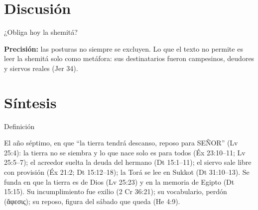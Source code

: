 \documentclass[hyperref={bookmarks=false},aspectratio=169]{beamer}
\newcommand{\grc}[1]{\foreignlanguage{ancientgreek}{#1}}
\newcommand{\SENOR}{S{\fontsize{0.78em}{1em}\selectfont EÑOR}}
\newcommand{\precision}[1]{{\footnotesize\color{sepia}\textbf{Precisión:} #1}}
\begin{document}
\section{Discusión}

\begin{frame}{¿Obliga hoy la shemitá?}
\par\medskip
\precision{las posturas no siempre se excluyen. Lo que el texto no permite es leer la shemitá solo como metáfora: sus destinatarios fueron campesinos, deudores y siervos reales (Jer 34).}
\end{frame}

\section{Síntesis}

\begin{frame}{Definición}
\begin{tcolorbox}[colback=papiro,colframe=tierraroja,boxrule=1pt,arc=3pt,fonttitle=\bfseries,title=Shemitá]
\small El año séptimo, en que ``la tierra tendrá descanso, reposo para \SENOR'' (Lv 25:4): la tierra no se siembra y lo que nace solo es para todos (Éx 23:10--11; Lv 25:5--7); el acreedor suelta la deuda del hermano (Dt 15:1--11); el siervo sale libre con provisión (Éx 21:2; Dt 15:12--18); la Torá se lee en Sukkot (Dt 31:10--13). Se funda en que la tierra es de Dios (Lv 25:23) y en la memoria de Egipto (Dt 15:15). Su incumplimiento fue exilio (2 Cr 36:21); su vocabulario, perdón (\grc{ἄφεσις}); su reposo, figura del sábado que queda (He 4:9).
\end{tcolorbox}
\end{frame}
\end{document}
